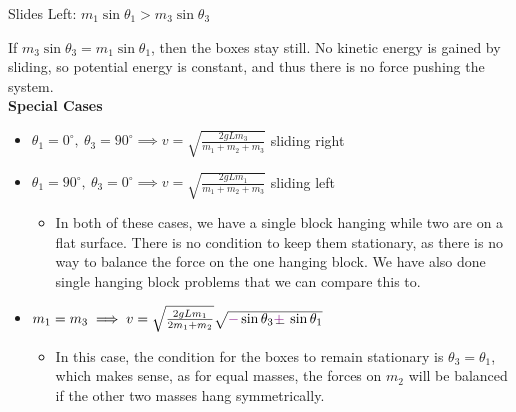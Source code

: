 \documentclass[]{article}
\begin{document}
\begin{TeacherMargin}
\begin{multicols}{2}
	{\color{violet}Slides Left: $m_{1}\sin\theta_{1} > m_{3}\sin\theta_{3}$}
\end{multicols}
\vspace{-10pt}
\noindent If $m_{3}\sin\theta_{3} = m_{1}\sin\theta_{1}$, then the boxes stay still. No kinetic energy is gained by sliding, so potential energy is constant, and thus there is no force pushing the system. \\
\textbf{Special Cases}
\begin{itemize}
	\item $\theta_{1}=0^{\circ},\ \theta_{3}=90^{\circ} \implies v = \sqrt{\frac{2gLm_{3}}{m_{1}+m_{2}+m_{3}}}$ sliding right
	\item $\theta_{1}=90^{\circ},\ \theta_{3}=0^{\circ} \implies v = \sqrt{\frac{2gLm_{1}}{m_{1}+m_{2}+m_{3}}}$ {\color{violet}sliding left}
	\begin{itemize}
		\item In both of these cases, we have a single block hanging while two are on a flat surface. There is no condition to keep them stationary, as there is no way to balance the force on the one hanging block. We have also done single hanging block problems that we can compare this to.
	\end{itemize}
	\item $m_{1}=m_{3} \implies v = \sqrt{\frac{2gLm_{1}}{2m_{1}+m_{2}}}\sqrt{{\color{violet}-}\sin\theta_{3}\Vpm\sin\theta_{1}}$
	\begin{itemize}
		\item In this case, the condition for the boxes to remain stationary is $\theta_{3}=\theta_{1}$, which makes sense, as for equal masses, the forces on $m_{2}$ will be balanced if the other two masses hang symmetrically.
	\end{itemize}
\end{itemize}
\end{TeacherMargin}
\end{document}
